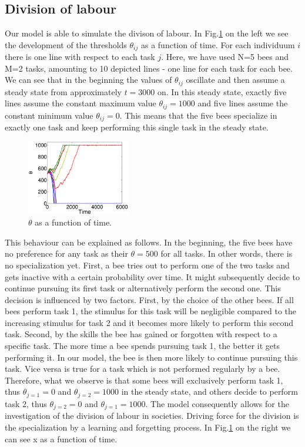 
\subsection{Division of labour}
Our model is able to simulate the divison of labour. In Fig.\ref{fig:thetax} on the left we see the development of the thresholds $\theta_{ij}$ as a function of time. For each individuum $i$ there is one line with respect to each task $j$. Here, we have used N=5 bees and M=2 tasks, amounting to 10 depicted lines - one line for each task for each bee. We can see that in the beginning the values of $\theta_{ij}$ oscillate and then assume a steady state from approximately $t=3000$ on. In this steady state, exactly five lines assume the constant maximum value $\theta_{ij}=1000$ and five lines assume the constant minimum value $\theta_{ij}=0$. This means that the five bees specialize in exactly one task and keep performing this single task in the steady state.

\begin{figure}[ht!]
	\centering
	\includegraphics[width=0.4\textwidth]{figures/thetax.eps}
	\caption{$\theta$ as a function of time.}
	\label{fig:thetax}
\end{figure}

This behaviour can be explained as follows. In the beginning, the five bees have no preference for any task as their $\theta=500$ for all tasks. In other words, there is no specialization yet. First, a bee tries out to perform one of the two tasks and gets inactive with a certain probability over time. It might subsequently decide to continue pursuing its first task or alternatively perform the second one. This decision is influenced by two factors. First, by the choice of the other bees. If all bees perform task 1, the stimulus for this task will be negligible compared to the increasing stimulus for task 2 and it becomes more likely to perform this second task. Second, by the skills the bee has gained or forgotten with respect to a specific task. The more time a bee spends pursuing task 1, the better it gets performing it. In our model, the bee is then more likely to continue pursuing this task. Vice versa is true for a task which is not performed regularly by a bee. Therefore, what we observe is that some bees will exclusively perform task 1, thus $\theta_{j=1}=0$ and $\theta_{j=2}=1000$ in the steady state, and others decide to perform task 2, thus $\theta_{j=2}=0$ and $\theta_{j=1}=1000$. The model consequently allows for the investigation of the division of labour in societies. Driving force for the division is the specialization by a learning and forgetting process.
In Fig.\ref{fig:thetax}  on the right we can see x as a function of time.

